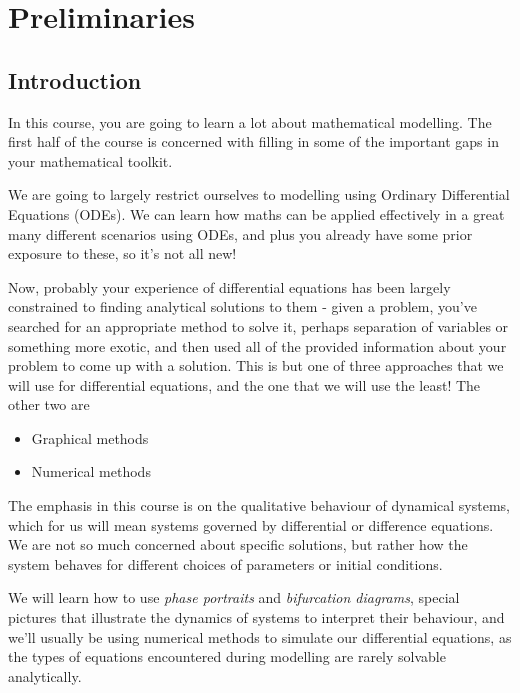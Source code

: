 \part{Preliminaries}
\chapter{Introduction}
In this course, you are going to learn a lot about mathematical modelling.
The first half of the course is concerned with filling in some of the
important gaps in your mathematical toolkit.  

We are going to largely restrict ourselves to modelling using Ordinary
Differential Equations (ODEs). We can learn how maths can be applied
effectively in a great many different scenarios using ODEs, and plus you
already have some prior exposure to these, so it's not all new! 

Now, probably your experience of differential equations has been largely
constrained to finding analytical solutions to them - given a problem,
you've searched for an appropriate method to solve it, perhaps separation
of variables or something more exotic, and then used all of the provided
information about your problem to come up with a solution. This is but one
of three approaches that we will use for differential equations, and the
one that we will use the least! The other two are 
\begin{itemize}
    \item Graphical methods
    \item Numerical methods
\end{itemize}
The emphasis in this course is on the qualitative behaviour of dynamical
systems, which for us will mean systems governed by differential or
difference equations. We are not so much concerned about specific
solutions, but rather how the system behaves for different choices of
parameters or initial conditions.

We will learn how to use \emph{phase portraits} and \emph{bifurcation
diagrams}, special pictures that illustrate the dynamics of systems to
interpret their behaviour, and we'll usually be using numerical methods to
simulate our differential equations, as the types of equations encountered
during modelling are rarely solvable analytically.

